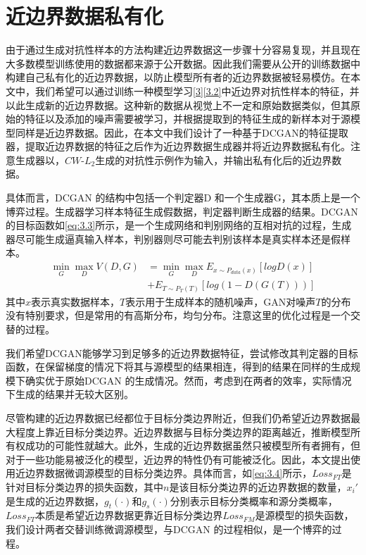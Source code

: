 \section{近边界数据私有化}\label{3.3}

由于通过生成对抗性样本的方法构建近边界数据这一步骤十分容易复现，并且现在大多数模型训练使用的数据都来源于公开数据。因此我们需要从公开的训练数据中构建自己私有化的近边界数据，以防止模型所有者的近边界数据被轻易模仿。在本文中，我们希望可以通过训练一种模型学习\ref{3}\ref{3.2}中近边界对抗性样本的特征，并以此生成新的近边界数据。这种新的数据从视觉上不一定和原始数据类似，但其原始的特征以及添加的噪声需要被学习，并根据提取到的特征生成的新样本对于源模型同样是近边界数据。因此，在本文中我们设计了一种基于DCGAN\cite{radford2015unsupervised}的特征提取器，提取近边界数据的特征之后作为近边界数据生成器并将近边界数据私有化。注意生成器以，$CW$-$L_2$生成的对抗性示例作为输入，并输出私有化后的近边界数据。

具体而言，DCGAN 的结构中包括一个判定器D 和一个生成器G，其本质上是一个博弈过程。生成器学习样本特征生成假数据，判定器判断生成器的结果。DCGAN 的目标函数如\ref{eq:3.3}所示，是一个生成网络和判别网络的互相对抗的过程，生成器尽可能生成逼真输入样本，判别器则尽可能去判别该样本是真实样本还是假样本。
\begin{equation}
	\label{eq:3.3}
	\begin{split}
		\mathop{min} \limits_{G} \mathop{max} \limits_{D} V(D, G) &= \mathop{min} \limits_{G} \mathop{max} \limits_{D} E_{x \sim P_{data}(x)}[logD(x)] \\
		&+ E_{T \sim P_{T}(T)}[log(1 - D(G(T)))]
	\end{split}
\end{equation}
其中$x$表示真实数据样本，$T$表示用于生成样本的随机噪声，GAN对噪声$T$的分布没有特别要求，但是常用的有高斯分布，均匀分布。注意这里的优化过程是一个交替的过程。

我们希望DCGAN能够学习到足够多的近边界数据特征，尝试修改其判定器的目标函数，在保留梯度的情况下将其与源模型的结果相连，得到的结果在同样的生成规模下确实优于原始DCGAN 的生成情况。然而，考虑到在两者的效率，实际情况下生成的结果并无较大区别。

尽管构建的近边界数据已经都位于目标分类边界附近，但我们仍希望近边界数据最大程度上靠近目标分类边界。近边界数据与目标分类边界的距离越近，推断模型所有权成功的可能性就越大。此外，生成的近边界数据虽然只被模型所有者拥有，但对于一些功能易被泛化的模型，近边界的特性仍有可能被泛化。因此，本文提出使用近边界数据微调源模型的目标分类边界。具体而言，如\ref{eq:3.4}所示，$Loss_{FT}$是针对目标分类边界的损失函数，其中$n$是该目标分类边界的近边界数据的数量，$x_i'$是生成的近边界数据，$g_t(\cdot)$和$g_s(\cdot)$分别表示目标分类概率和源分类概率，$Loss_{FT}$本质是希望近边界数据更靠近目标分类边界$Loss_{FM}$是源模型的损失函数，我们设计两者交替训练微调源模型，与DCGAN 的过程相似，是一个博弈的过程。

